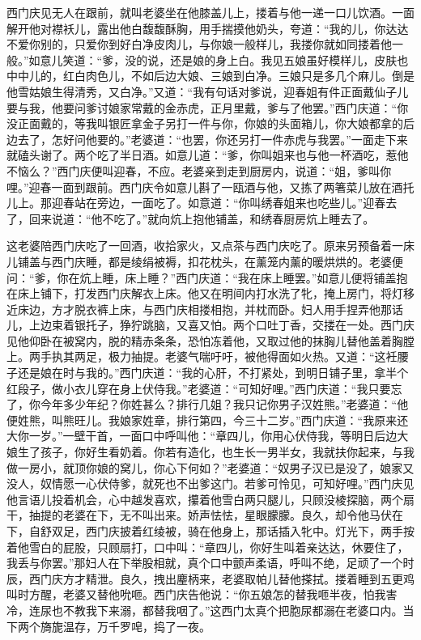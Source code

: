 西门庆见无人在跟前，就叫老婆坐在他膝盖儿上，搂着与他一递一口儿饮酒。一面解开他对襟袄儿，露出他白馥馥酥胸，用手揣摸他奶头，夸道：“我的儿，你达达不爱你别的，只爱你到好白净皮肉儿，与你娘一般样儿，我搂你就如同搂着他一般。”如意儿笑道：“爹，没的说，还是娘的身上白。我见五娘虽好模样儿，皮肤也中中儿的，红白肉色儿，不如后边大娘、三娘到白净。三娘只是多几个麻儿。倒是他雪姑娘生得清秀，又白净。”又道：“我有句话对爹说，迎春姐有件正面戴仙子儿要与我，他要问爹讨娘家常戴的金赤虎，正月里戴，爹与了他罢。”西门庆道：“你没正面戴的，等我叫银匠拿金子另打一件与你，你娘的头面箱儿，你大娘都拿的后边去了，怎好问他要的。”老婆道：“也罢，你还另打一件赤虎与我罢。”一面走下来就磕头谢了。两个吃了半日酒。如意儿道：“爹，你叫姐来也与他一杯酒吃，惹他不恼么？”西门庆便叫迎春，不应。老婆亲到走到厨房内，说道：“姐，爹叫你哩。”迎春一面到跟前。西门庆令如意儿斟了一瓯酒与他，又拣了两箸菜儿放在酒托儿上。那迎春站在旁边，一面吃了。如意道：“你叫绣春姐来也吃些儿。”迎春去了，回来说道：“他不吃了。”就向炕上抱他铺盖，和绣春厨房炕上睡去了。

这老婆陪西门庆吃了一回酒，收拾家火，又点茶与西门庆吃了。原来另预备着一床儿铺盖与西门庆睡，都是绫绢被褥，扣花枕头，在薰笼内薰的暖烘烘的。老婆便问：“爹，你在炕上睡，床上睡？”西门庆道：“我在床上睡罢。”如意儿便将铺盖抱在床上铺下，打发西门庆解衣上床。他又在明间内打水洗了牝，掩上房门，将灯移近床边，方才脱衣裤上床，与西门庆相搂相抱，并枕而卧。妇人用手捏弄他那话儿，上边束着银托子，狰狞跳脑，又喜又怕。两个口吐丁香，交搂在一处。西门庆见他仰卧在被窝内，脱的精赤条条，恐怕冻着他，又取过他的抹胸儿替他盖着胸膛上。两手执其两足，极力抽提。老婆气喘吁吁，被他得面如火热。又道：“这衽腰子还是娘在时与我的。”西门庆道：“我的心肝，不打紧处，到明日铺子里，拿半个红段子，做小衣儿穿在身上伏侍我。”老婆道：“可知好哩。”西门庆道：“我只要忘了，你今年多少年纪？你姓甚么？排行几姐？我只记你男子汉姓熊。”老婆道：“他便姓熊，叫熊旺儿。我娘家姓章，排行第四，今三十二岁。”西门庆道：“我原来还大你一岁。”一壁干首，一面口中呼叫他：“章四儿，你用心伏侍我，等明日后边大娘生了孩子，你好生看奶着。你若有造化，也生长一男半女，我就扶你起来，与我做一房小，就顶你娘的窝儿，你心下何如？”老婆道：“奴男子汉已是没了，娘家又没人，奴情愿一心伏侍爹，就死也不出爹这门。若爹可怜见，可知好哩。”西门庆见他言语儿投着机会，心中越发喜欢，攥着他雪白两只腿儿，只顾没棱探脑，两个扇干，抽提的老婆在下，无不叫出来。娇声怯怯，星眼朦朦。良久，却令他马伏在下，自舒双足，西门庆披着红绫被，骑在他身上，那话插入牝中。灯光下，两手按着他雪白的屁股，只顾扇打，口中叫：“章四儿，你好生叫着亲达达，休要住了，我丢与你罢。”那妇人在下举股相就，真个口中颤声柔语，呼叫不绝，足顽了一个时辰，西门庆方才精泄。良久，拽出麈柄来，老婆取帕儿替他搽拭。搂着睡到五更鸡叫时方醒，老婆又替他吮咂。西门庆告他说：“你五娘怎的替我咂半夜，怕我害冷，连尿也不教我下来溺，都替我咽了。”这西门太真个把胞尿都溺在老婆口内。当下两个旖旎温存，万千罗唣，捣了一夜。

